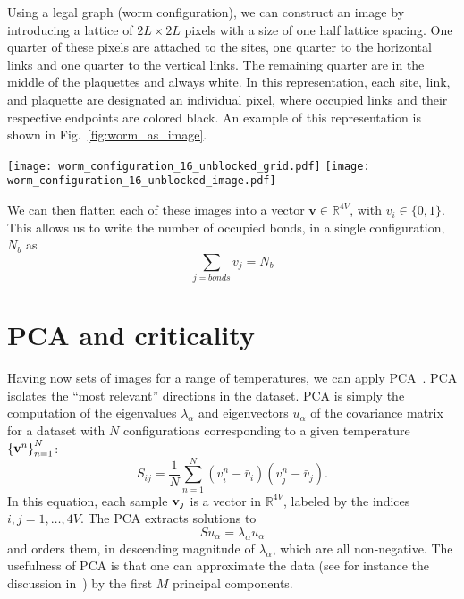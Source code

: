 \documentclass[../main.tex]{subfiles}
\begin{document}
Using a legal graph (worm configuration), we can construct an image by
introducing a lattice of $2L\times2L$  pixels with a size of one half lattice
spacing.  One quarter of these pixels are attached to the sites, one quarter to
the horizontal links and one quarter to the vertical links. The remaining
quarter are in the middle of the plaquettes and always white.  In this
representation, each site, link, and plaquette are designated an individual
pixel, where occupied links and their respective endpoints are colored black.
An example of this representation is shown in
Fig.~\ref{fig:worm_as_image}.
%
\begin{figure*}[htpb]
    \centering
    \texttt{[image: worm\_configuration\_16\_unblocked\_grid.pdf]}\hfill
    \texttt{[image: worm\_configuration\_16\_unblocked\_image.pdf]}
    \caption{(a) Legal worm configuration on an $L \times L$ lattice with periodic boundary conditions and; (b) its
    equivalent representation as a $2L\times2L$ black and white pixel image.}%
\label{fig:worm_as_image}
\end{figure*}
%
We can then flatten each of these images into a vector $\mathbf{v} \in
\mathbb{R}^{4V}$, with $v_i \in \{0, 1\}$. This allows us to write the number
of occupied bonds, in a single configuration, $N_b$ as
%
\begin{equation}
    \sum_{j = bonds} v_j = N_b
    \label{eq:link_sum}
\end{equation}
%
\section{PCA and criticality}%
\label{sec:pca}
Having now sets of images for a range of temperatures, we can apply
PCA~\cite{Bishop}.  PCA isolates the ``most relevant'' directions in the
dataset.  PCA is simply the computation of the eigenvalues $\lambda_\alpha$ and
eigenvectors $u_\alpha$ of the covariance matrix for a dataset with $N$
configurations corresponding to a given temperature ${\{{\bf v}^n\}}_{n=1}^N$:
%
\begin{equation}
S_{ij} = \frac{1}{N} \sum_{n=1}^N (v_{i}^n - {\bar v}_i)
(v_{j}^n - {\bar v}_j).
\end{equation}
%
In this equation, each sample ${\bf v}_j$ is a vector in $\mathbb{R}^{4V}$,
labeled by the indices $i,j = 1,\ldots,4V$.
%
The PCA extracts solutions to
%
\begin{equation}
S u_\alpha = \lambda_\alpha u_\alpha
\end{equation}
%
and orders them, in descending magnitude of $\lambda_\alpha$, which are all
non-negative. The usefulness of PCA is that one can approximate the data (see
for instance the discussion in~\cite{Bishop}) by the first $M$ principal
components. 
\end{document}
